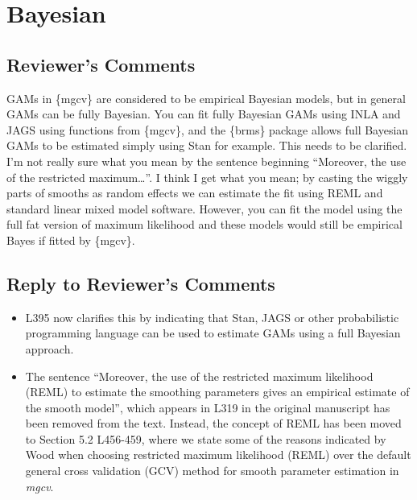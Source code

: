 \documentclass[
]{article}
\begin{document}
\hypertarget{bayesian}{%
\section{Bayesian}\label{bayesian}}

\hypertarget{reviewers-comments-6}{%
\subsection{Reviewer's Comments}\label{reviewers-comments-6}}

GAMs in \{mgcv\} are considered to be empirical Bayesian models, but in general GAMs can be fully Bayesian. You can fit fully Bayesian GAMs using INLA and JAGS using functions from \{mgcv\}, and the \{brms\} package allows full Bayesian GAMs to be estimated simply using Stan for example. This needs to be clarified.
I'm not really sure what you mean by the sentence beginning ``Moreover, the use of the restricted maximum\ldots{}''. I think I get what you mean; by casting the wiggly parts of smooths as random effects we can estimate the fit using REML
and standard linear mixed model software. However, you can fit the model using the full fat version of maximum likelihood and these models would still be empirical Bayes if fitted by \{mgcv\}.

\hypertarget{section-7}{%
\subsection{\texorpdfstring{\textcolor{reviewersblue} {Reply to Reviewer's Comments}}{}}\label{section-7}}

\begin{itemize}
\item
  L395 now clarifies this by indicating that Stan, JAGS or other probabilistic programming language can be used to estimate GAMs using a full Bayesian approach.
\item
  The sentence ``Moreover, the use of the restricted maximum likelihood (REML) to estimate the smoothing parameters gives an empirical estimate of the smooth model'', which appears in L319 in the original manuscript has been removed from the text. Instead, the concept of REML has been moved to Section 5.2 L456-459, where we state some of the reasons indicated by Wood when choosing restricted maximum likelihood (REML) over the default general cross validation (GCV) method for smooth parameter estimation in \emph{mgcv}.
\end{itemize}
\end{document}
